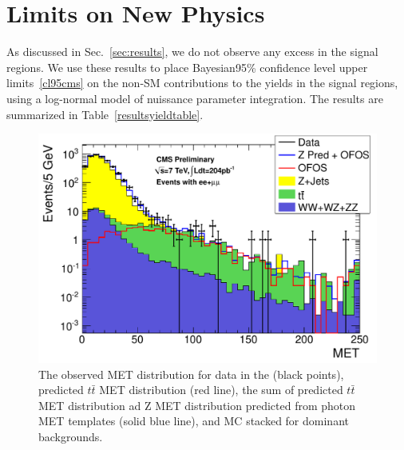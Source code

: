 \section{Limits on New Physics}
\label{sec:limit}

As discussed in Sec.~\ref{sec:results}, we do not observe any excess in the signal regions.
We use these results to place Bayesian95\% confidence level upper limits~\ref{cl95cms} on 
the non-SM contributions to the yields in the signal regions, using a log-normal model
of nuissance parameter integration. The results are summarized in Table~\ref{resultsyieldtable}.  


\begin{figure}[hbt]
\begin{center}
\includegraphics[width=0.78\linewidth]{plots/lep_metPredicted.pdf}
\caption{\label{fig:results}\protect 
     The observed MET distribution for data in the (black points),
      predicted $t\bar{t}$ MET distribution (red line), the sum of predicted %
	  $t\bar{t}$ MET distribution ad
      Z  MET  distribution  predicted  from photon  MET  templates
      (solid blue line),  and MC stacked for dominant backgrounds. 
}
\end{center}
\end{figure}

